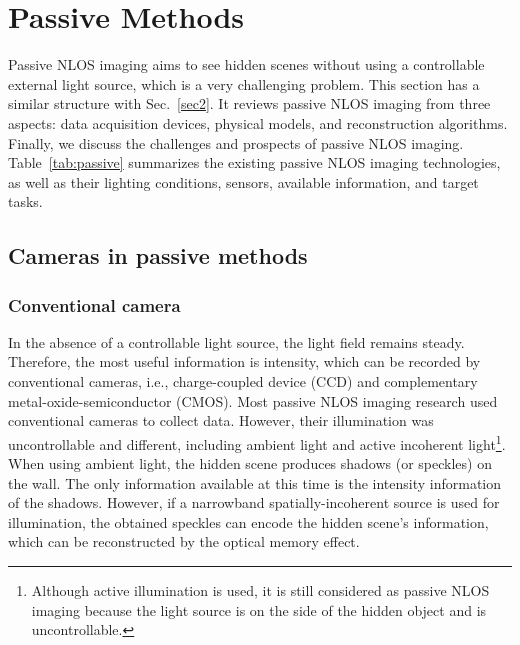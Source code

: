 \section{Passive Methods} \label{sec3}
Passive NLOS imaging aims to see hidden scenes without using a controllable external light source, which is a very challenging problem. This section has a similar structure with Sec.~\ref{sec2}. It reviews passive NLOS imaging from three aspects: data acquisition devices, physical models, and reconstruction algorithms. Finally, we discuss the challenges and prospects of passive NLOS imaging.
Table~\ref{tab:passive} summarizes the existing passive NLOS imaging technologies, as well as their lighting conditions, sensors, available information, and target tasks.

\subsection{Cameras in passive methods} \label{sec31}

\subsubsection{Conventional camera}
In the absence of a controllable light source, the light field remains steady. Therefore, the most useful information is intensity, which can be recorded by conventional cameras, i.e.,  charge-coupled device (CCD) and complementary metal-oxide-semiconductor (CMOS). Most passive NLOS imaging research used conventional cameras to collect data. However, their illumination was uncontrollable and different, including ambient light\cite{saundersComputationalPeriscopyOrdinary2019,aittalaComputationalMirrorsBlind2019} and active incoherent light\cite{katz2014non}\footnote{Although active illumination is used, it is still considered as passive NLOS imaging because the light source is on the side of the hidden object and is uncontrollable.}.
When using ambient light, the hidden scene produces shadows (or speckles) on the wall. The only information available at this time is the intensity information of the shadows. However, if a narrowband spatially-incoherent source is used for illumination, the obtained speckles can encode the hidden scene's information, which can be reconstructed by the optical memory effect\cite{fengCorrelationsFluctuationsCoherent1988,freundMemoryEffectsPropagation1988,osnabruggeGeneralizedOpticalMemory2017}. 

